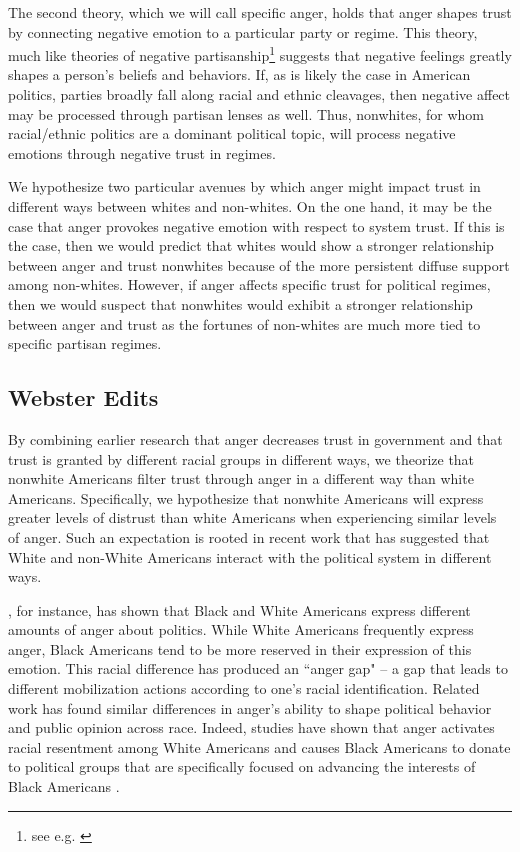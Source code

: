 \documentclass[12t, letterpaper]{article}
\begin{document}
The second theory, which we will call specific anger, holds that anger shapes trust by connecting negative emotion to a particular party or regime. This theory, much like theories of negative partisanship\footnote{see e.g. \cite{abramowitz2016}} suggests that negative feelings greatly shapes a person's beliefs and behaviors. If, as is likely the case in American politics, parties broadly fall along racial and ethnic cleavages, then negative affect may be processed through partisan lenses as well. Thus, nonwhites, for whom racial/ethnic politics are a dominant political topic, will process negative emotions through negative trust in regimes.

We hypothesize two particular avenues by which anger might impact trust in different ways between whites and non-whites. On the one hand, it may be the case that anger provokes negative emotion with respect to system trust. If this is the case, then we would predict that whites would show a stronger relationship between anger and trust nonwhites because of the more persistent diffuse support among non-whites. However, if anger affects specific trust for political regimes, then we would suspect that nonwhites would exhibit a stronger relationship between anger and trust as the fortunes of non-whites are much more tied to specific partisan regimes.

\subsection{Webster Edits}

By combining earlier research that anger decreases trust in government and that trust is granted by different racial groups in different ways, we theorize that nonwhite Americans filter trust through anger in a different way than white Americans. Specifically, we hypothesize that nonwhite Americans will express greater levels of distrust than white Americans when experiencing similar levels of anger. Such an expectation is rooted in recent work that has suggested that White and non-White Americans interact with the political system in different ways.

\citet{phoenix2019}, for instance, has shown that Black and White Americans express different amounts of anger about politics. While White Americans frequently express anger, Black Americans tend to be more reserved in their expression of this emotion. This racial difference has produced an ``anger gap" -- a gap that leads to different mobilization actions according to one's racial identification. Related work has found similar differences in anger's ability to shape political behavior and public opinion across race. Indeed, studies have shown that anger activates racial resentment among White Americans \citep{banks2014} and causes Black Americans to donate to political groups that are specifically focused on advancing the interests of Black Americans \citep{banks_white_mckenzie2019}.
\end{document}
